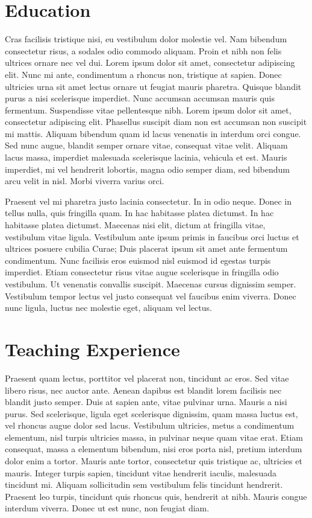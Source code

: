\documentclass[letterpaper]{article}
\begin{document}
\section*{Education}
Cras facilisis tristique nisi, eu vestibulum dolor molestie vel. Nam
bibendum consectetur risus, a sodales odio commodo aliquam. Proin et
nibh non felis ultrices ornare nec vel dui. Lorem ipsum dolor sit
amet, consectetur adipiscing elit. Nunc mi ante, condimentum a rhoncus
non, tristique at sapien. Donec ultricies urna sit amet lectus ornare
ut feugiat mauris pharetra. Quisque blandit purus a nisi scelerisque
imperdiet. Nunc accumsan accumsan mauris quis fermentum. Suspendisse
vitae pellentesque nibh. Lorem ipsum dolor sit amet, consectetur
adipiscing elit. Phasellus suscipit diam non est accumsan non suscipit
mi mattis. Aliquam bibendum quam id lacus venenatis in interdum orci
congue. Sed nunc augue, blandit semper ornare vitae, consequat vitae
velit. Aliquam lacus massa, imperdiet malesuada scelerisque lacinia,
vehicula et est. Mauris imperdiet, mi vel hendrerit lobortis, magna
odio semper diam, sed bibendum arcu velit in nisl. Morbi viverra
varius orci.

Praesent vel mi pharetra justo lacinia consectetur. In in odio neque.
Donec in tellus nulla, quis fringilla quam. In hac habitasse platea
dictumst. In hac habitasse platea dictumst. Maecenas nisi elit, dictum
at fringilla vitae, vestibulum vitae ligula. Vestibulum ante ipsum
primis in faucibus orci luctus et ultrices posuere cubilia Curae; Duis
placerat ipsum sit amet ante fermentum condimentum. Nunc facilisis
eros euismod nisl euismod id egestas turpis imperdiet. Etiam
consectetur risus vitae augue scelerisque in fringilla odio
vestibulum. Ut venenatis convallis suscipit. Maecenas cursus dignissim
semper. Vestibulum tempor lectus vel justo consequat vel faucibus enim
viverra. Donec nunc ligula, luctus nec molestie eget, aliquam vel
lectus.

\section*{Teaching Experience}
Praesent quam lectus, porttitor vel placerat non, tincidunt ac eros.
Sed vitae libero risus, nec auctor ante. Aenean dapibus est blandit
lorem facilisis nec blandit justo semper. Duis at sapien ante, vitae
pulvinar urna. Mauris a nisi purus. Sed scelerisque, ligula eget
scelerisque dignissim, quam massa luctus est, vel rhoncus augue dolor
sed lacus. Vestibulum ultricies, metus a condimentum elementum, nisl
turpis ultricies massa, in pulvinar neque quam vitae erat. Etiam
consequat, massa a elementum bibendum, nisi eros porta nisl, pretium
interdum dolor enim a tortor. Mauris ante tortor, consectetur quis
tristique ac, ultricies et mauris. Integer turpis sapien, tincidunt
vitae hendrerit iaculis, malesuada tincidunt mi. Aliquam sollicitudin
sem vestibulum felis tincidunt hendrerit. Praesent leo turpis,
tincidunt quis rhoncus quis, hendrerit at nibh. Mauris congue interdum
viverra. Donec ut est nunc, non feugiat diam.
\end{document}
